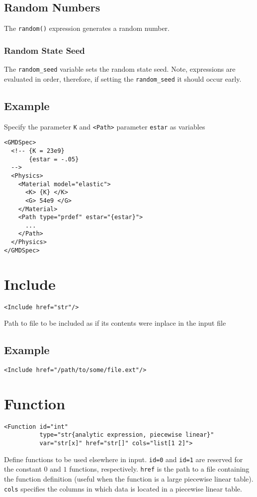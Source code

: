 \documentclass[11pt]{report}
\renewcommand{\tag}[1]{\texttt{<#1>}}
\newcommand{\reqdtag}[1]{\Red{\texttt{<#1>}}}
\begin{document}
\subsection{Random Numbers}
The \texttt{random()} expression generates a random number.

\subsubsection{Random State Seed}
The \verb:random_seed: variable sets the random state seed.  Note, expressions
are evaluated in order, therefore, if setting the \verb:random_seed: it should
occur early.

\subsection{Example}
Specify the \reqdtag{Material} parameter \texttt{K} and \tag{Path} parameter
\texttt{estar} as variables
\begin{verbatim}
<GMDSpec>
  <!-- {K = 23e9}
       {estar = -.05}
  -->
  <Physics>
    <Material model="elastic">
      <K> {K} </K>
      <G> 54e9 </G>
    </Material>
    <Path type="prdef" estar="{estar}">
      ...
    </Path>
  </Physics>
</GMDSpec>
\end{verbatim}

\section{Include}
\begin{verbatim}
<Include href="str"/>
\end{verbatim}
%
Path to file to be included as if its contents were inplace in the input file

\subsection{Example}
\begin{verbatim}
<Include href="/path/to/some/file.ext"/>
\end{verbatim}

\section{Function}
\begin{verbatim}
<Function id="int"
          type="str{analytic expression, piecewise linear}"
          var="str[x]" href="str[]" cols="list[1 2]">
\end{verbatim}
%
Define functions to be used elsewhere in input. \texttt{id=0} and
\texttt{id=1} are reserved for the constant $0$ and $1$ functions,
respectively. \texttt{href} is the path to a file containing the function
definition (useful when the function is a large piecewise linear table).
\texttt{cols} specifies the columns in which data is located in a piecewise
linear table.
\end{document}
